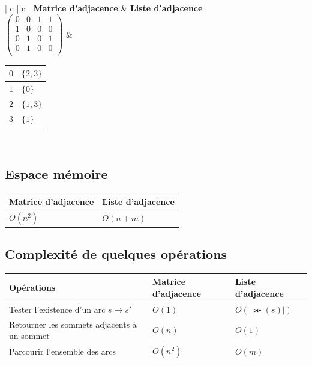 \begin{center}
   \begin{tabular}{| c | c | }
     \hline
     \textbf{Matrice d'adjacence} 	& \textbf{Liste d'adjacence}\\
     \hline
$
\begin{pmatrix} 
 0 & 0 & 1 & 1 \\
 1 & 0 & 0 & 0 \\
 0 & 1 & 0 & 1 \\
 0 & 1 & 0 & 0 \\
 \end{pmatrix}
$
& 
	\begin{tabular}{|l|l|}
  	\hline
  	$0$ & $\{2, 3\}$ \\\hline
  	$1$ & $\{0\}$ \\\hline
  	$2$ & $\{1, 3\}$ \\\hline
  	$3$ & $\{1\}$ \\
  	\hline
   	\end{tabular}
   	
   \\
   \hline
   \end{tabular}
 \end{center}



\subsection{Espace mémoire}
\begin{center}
   \begin{tabular}{| l | l | }
     \hline
     \textbf{Matrice d'adjacence} 	& \textbf{Liste d'adjacence}\\
     \hline
     $O(n^2)$						& $O(n+m)$             	   \\ 
     \hline
   \end{tabular}
 \end{center}


\subsection{Complexité de quelques opérations}
\begin{center}
   \begin{tabular}{| l | l | l | }
     \hline
     \textbf{Opérations} 							& \textbf{Matrice d'adjacence} & \textbf{Liste d'adjacence} \\
     \hline
     Tester l'existence d'un arc $s\rightarrow s'$		& $O(1)$ 						& $O(|\Succ(s)|)$ \\
     \hline
     Retourner les sommets adjacents à un sommet		& $O(n)$ 						& $O(1)$ \\
     \hline
     Parcourir l'ensemble des arcs	 				& $O(n^2)$ 					& $O(m)$ \\
     \hline
   \end{tabular}
 \end{center}


